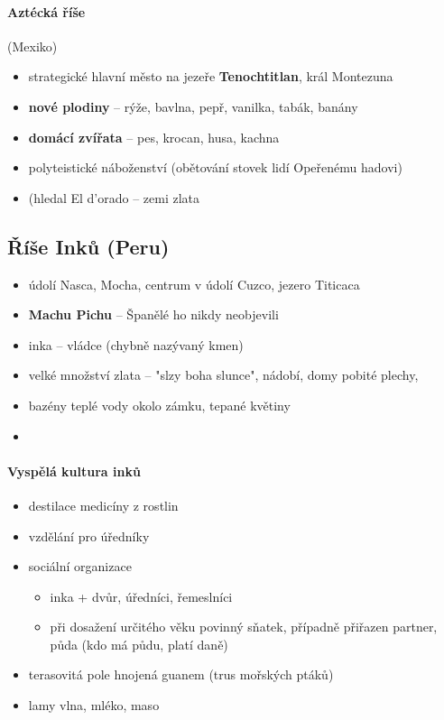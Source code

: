 \paragraph{Aztécká říše} (Mexiko)
\begin{itemize}
\item strategické hlavní město na jezeře \textbf{Tenochtitlan}, král Montezuna
\item \textbf{nové plodiny} -- rýže, bavlna, pepř, vanilka, tabák, banány
\item \textbf{domácí zvířata} -- pes, krocan, husa, kachna
\item polyteistické náboženství (obětování stovek lidí Opeřenému hadovi)
\item {} (hledal El d'orado -- zemi zlata
\end{itemize}

\subsection{Říše Inků (Peru)}
\begin{itemize}
\item údolí Nasca, Mocha, centrum v údolí Cuzco, jezero Titicaca
\item \textbf{Machu Pichu} -- Španělé ho nikdy neobjevili
\item inka -- vládce (\ra chybně nazývaný kmen)
\item velké množství zlata -- "slzy boha slunce", nádobí, domy pobité plechy, 
\item bazény teplé vody okolo zámku, tepané květiny
\item {}
\end{itemize}

\paragraph{Vyspělá kultura inků}
\begin{itemize}
\item destilace medicíny z rostlin
\item vzdělání pro úředníky
\item sociální organizace 
	\begin{itemize}
	\item inka + dvůr, úředníci, řemeslníci
	\item při dosažení určitého věku povinný sňatek, případně přiřazen partner, půda (kdo má půdu, platí daně)
	\end{itemize}
\item terasovitá pole hnojená guanem (trus mořských ptáků)
\item lamy \ra vlna, mléko, maso
\end{itemize}



